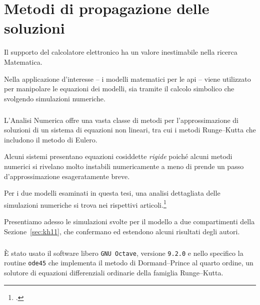 \chapter{Metodi di propagazione delle soluzioni}
Il supporto del calcolatore elettronico ha un valore inestimabile nella ricerca Matematica.

Nella applicazione d'interesse -- i modelli matematici per le api -- viene utilizzato
per manipolare le equazioni dei modelli, sia tramite il calcolo simbolico che svolgendo simulazioni numeriche.

\paragraph{}
L'Analisi Numerica offre una vasta classe di metodi per l'approssimazione di soluzioni di un sistema di equazioni
non lineari, tra cui i metodi Runge--Kutta che includono il metodo di Eulero.

Alcuni sistemi presentano equazioni cosiddette \emph{rigide} poiché alcuni metodi numerici si rivelano
molto instabili numericamente a meno di prende un passo d'approssimazione esageratamente breve.

Per i due modelli esaminati in questa tesi, una analisi dettagliata delle simulazioni numeriche
si trova nei rispettivi articoli.\footcite{khoury2011,ratti2017}

Presentiamo adesso le simulazioni svolte per il modello a due compartimenti della Sezione~\ref{sec:kh11},
che confermano ed estendono alcuni risultati degli autori.

\paragraph{}
È stato usato il software libero \texttt{GNU Octave}, versione \texttt{9.2.0} e nello specifico
la routine \texttt{ode45} che implementa il metodo di Dormand--Prince al quarto ordine, un solutore
di equazioni differenziali ordinarie della famiglia Runge--Kutta.

